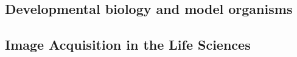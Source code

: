 
\subsection{Developmental biology and model organisms}



\subsection{Image Acquisition in the Life Sciences}


